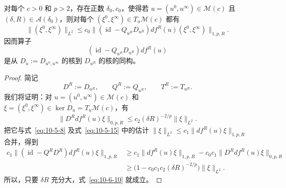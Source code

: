 \begin{lemma}\label{lem:10-6-3}
对每个 $c>0$ 和 $p>2$，存在正数 $\delta_0,c_0$，使得若
$u=(u^0,u^\infty)\in\mathcal M(c)$ 且
$(\delta,R)\in\mathcal A(\delta_0)$，则对每个
$(\xi^0,\xi^\infty)\in T_u\mathcal M(c)$ 都有
\begin{equation}\label{eq:10-6-10}
  \|(\xi^0,\xi^\infty)\|_{L^2}
  \le c_0\bigl\|
    (\operatorname{id}-Q_{u^R}D_{u^R})
    df^R(u)(\xi^0,\xi^\infty)
  \bigr\|_{1,p,R}.
\end{equation}
因而算子
\[
  (\operatorname{id}-Q_{u^R}D_{u^R})df^R(u)
\]
是从 $D_u:=D_{u^0,u^\infty}$ 的核到 $D_{u^R}$ 的核的同构。
\end{lemma}

\begin{proof}
简记
\[
  D^R:=D_{u^R},\qquad Q^R:=Q_{u^R},\qquad T^R:=T_{u^R}.
\]
我们将证明：对
$u=(u^0,u^\infty)\in\mathcal M(c)$ 和
$\xi=(\xi^0,\xi^\infty)\in\ker D_u=T_u\mathcal M(c)$，有
\begin{equation}\label{eq:10-6-11}
  \|D^Rdf^R(u)\xi\|_{0,p,R}
  \le c_2(\delta R)^{-2/p}\|\xi\|_{L^2}.
\end{equation}
把它与式~\eqref{eq:10-5-8} 及式~\eqref{eq:10-5-15} 中的估计
$\|\xi\|_{L^2}\le c_1\|df^R(u)\xi\|_{1,p,R}$ 合并，得到
\[
\begin{aligned}
  c_1\|(\operatorname{id}-Q^RD^R)df^R(u)\xi\|_{1,p,R}
  &\ge c_1\|df^R(u)\xi\|_{1,p,R}
     -c_0c_1\|D^Rdf^R(u)\xi\|_{0,p,R}\\
  &\ge\bigl(1-c_0c_1c_2(\delta R)^{-2/p}\bigr)
     \|\xi\|_{L^2}.
\end{aligned}
\]
所以，只要 $\delta R$ 充分大，式~\eqref{eq:10-6-10} 就成立。


\end{proof}
